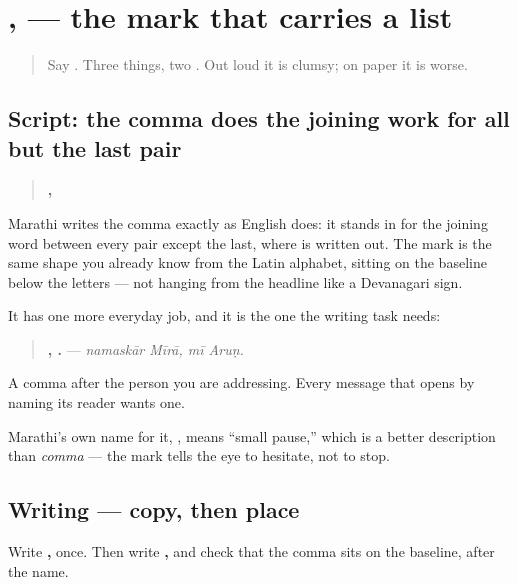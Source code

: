 \section[, (svalpaviraam)]{, — the mark that carries a list}

\label{lesson:MR-W34-comma}



\begin{quote}
Say \textbf{    }. Three things, two \textbf{}. Out loud it is clumsy; on paper it is worse.
\end{quote}

\subsection*{Script: the comma does the joining work for all but the last pair}
\begin{quote}
\textbf{,   }
\end{quote}

Marathi writes the comma exactly as English does: it stands in for the joining word between every pair except the last, where \textbf{} is written out. The mark is the same shape you already know from the Latin alphabet, sitting on the baseline below the letters — not hanging from the headline like a Devanagari sign.

It has one more everyday job, and it is the one the writing task needs:

\begin{quote}
\textbf{ ,  .} — \emph{namaskār Mīrā, mī Aruṇ.}
\end{quote}

A comma after the person you are addressing. Every message that opens by naming its reader wants one.

Marathi's own name for it, \textbf{}, means \textquotedblleft{}small pause,\textquotedblright{} which is a better description than \emph{comma} — the mark tells the eye to hesitate, not to stop.

\subsection*{Writing — copy, then place}
Write \textbf{,   } once. Then write \textbf{ ,} and check that the comma sits on the baseline, after the name.

